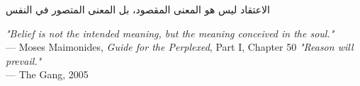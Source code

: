 \begin{flushright}
\begin{arabic}
الاعتقاد ليس هو المعنى المقصود، بل المعنى المتصور في النفس
\end{arabic}
\vspace{0.2em}
\emph{"Belief is not the intended meaning, but the meaning conceived in the soul."}\\
— Moses Maimonides, \textit{Guide for the Perplexed}, Part I, Chapter 50
\vspace{0.7em}
\emph{"Reason will prevail."}\\
— The Gang, 2005
\end{flushright}
